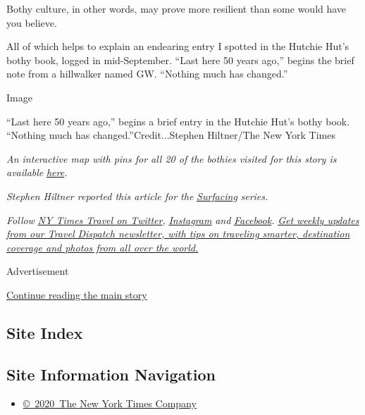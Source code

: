 Bothy culture, in other words, may prove more resilient than some would
have you believe.

All of which helps to explain an endearing entry I spotted in the
Hutchie Hut's bothy book, logged in mid-September. ``Last here 50 years
ago,'' begins the brief note from a hillwalker named GW. ``Nothing much
has changed.''

Image

``Last here 50 years ago,'' begins a brief entry in the Hutchie Hut's
bothy book. ``Nothing much has changed.''Credit...Stephen Hiltner/The
New York Times

\emph{An interactive map with pins for all 20 of the bothies visited for
this story is available}
\href{https://www.google.com/maps/d/viewer?mid=1Sh6WFFIyXw-KMxPUjV5q3xhFZTTFprTZ\&ll=56.07544038548426\%2C-1.0472777259095665\&z=6}{\emph{here}}\emph{.}

\emph{Stephen Hiltner reported this article for the}
\href{https://www.nytimes3xbfgragh.onion/series/surfacing-subculture-communities}{\emph{Surfacing}}
\emph{series.}

\emph{Follow} \href{https://twitter.com/nytimestravel}{\emph{NY Times
Travel on Twitter}}\emph{,}
\href{https://www.instagram.com/nytimestravel/}{\emph{Instagram}}
\emph{and}
\href{https://www.facebookcorewwwi.onion/nytimestravel/}{\emph{Facebook}}\emph{.}
\href{https://www.nytimes3xbfgragh.onion/newsletters/traveldispatch?module=inline}{\emph{Get
weekly updates from our Travel Dispatch newsletter, with tips on
traveling smarter, destination coverage and photos from all over the
world.}}

Advertisement

\protect\hyperlink{after-bottom}{Continue reading the main story}

\hypertarget{site-index}{%
\subsection{Site Index}\label{site-index}}

\hypertarget{site-information-navigation}{%
\subsection{Site Information
Navigation}\label{site-information-navigation}}

\begin{itemize}
\tightlist
\item
  \href{https://help.nytimes3xbfgragh.onion/hc/en-us/articles/115014792127-Copyright-notice}{©~2020~The
  New York Times Company}
\end{itemize}

